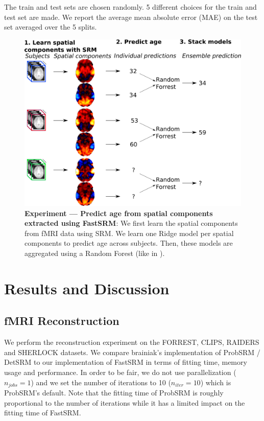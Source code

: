 The train and test sets are chosen randomly. 5 different choices for the train and test set are made. We report the average mean absolute error (MAE) on the test set averaged over the 5 splits.

\begin{figure}
\centering
\includegraphics[scale=0.35]{figures/srm/conceptual_figure72.png}
\caption{\textbf{Experiment — Predict age from spatial components extracted using FastSRM}: We first learn the spatial components from fMRI data using SRM. We learn one Ridge model per spatial components to predict age across subjects. Then, these models are aggregated using a Random Forest (like in \cite{rahim2017joint}).} 
\label{fig:experiment_age_prediction}
\end{figure}


\section{Results and Discussion}

\subsection{fMRI Reconstruction}
We perform the reconstruction experiment on the FORREST, CLIPS, RAIDERS and SHERLOCK datasets. We compare brainiak's implementation of ProbSRM / DetSRM to our implementation of FastSRM in terms of fitting time, memory usage and performance. In order to be fair, we do not use parallelization ($n_{jobs} = 1$) and we set the number of iterations to 10 ($n_{iter}=10$) which is ProbSRM's default. Note that the fitting time of ProbSRM is roughly proportional to the number of iterations while it has a limited impact on the fitting time of FastSRM. 


